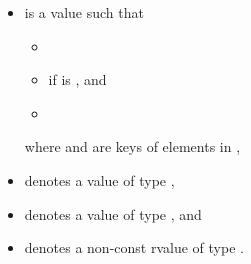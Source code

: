 \begin{itemize}
\item {} is a value such that
  \begin{itemize}
  \item {}
  \item {} if  is , and
  \item {}
  \end{itemize}
  where  and  are keys of elements in ,
\item {} denotes a value of type ,
\item {} denotes a value of type , and
\item {} denotes a non-const rvalue of type .
\end{itemize}

\newcommand{\indexunordmem}[1]{%
\indexlibrary{\idxcode{#1}!unordered associative containers}%
\indexlibrary{\idxcode{unordered_set}!\idxcode{#1}}%
\indexlibrary{\idxcode{unordered_map}!\idxcode{#1}}%
\indexlibrary{\idxcode{unordered_multiset}!\idxcode{#1}}%
\indexlibrary{\idxcode{unordered_multimap}!\idxcode{#1}}%
}


